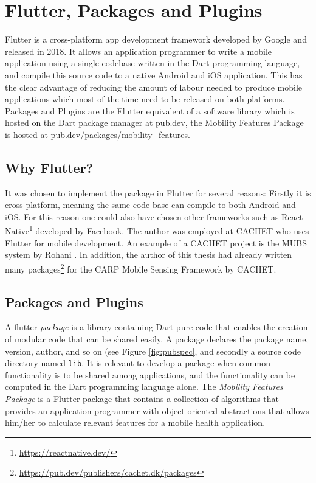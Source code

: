 \section{Flutter, Packages and Plugins}
Flutter is a cross-platform app development framework developed by Google and released in 2018. It allows an application programmer to write a mobile application using a single codebase written in the Dart programming language, and compile this source code to a native Android and iOS application. This has the clear advantage of reducing the amount of labour needed to produce mobile applications which most of the time need to be released on both platforms. Packages and Plugins are the Flutter equivalent of a software library which is hosted on the Dart package manager at \url{pub.dev}, the Mobility Features Package is hosted at \url{pub.dev/packages/mobility_features}. 

\subsection{Why Flutter?}
It was chosen to implement the package in Flutter for several reasons: Firstly it is cross-platform, meaning the same code base can compile to both Android and iOS. For this reason one could also have chosen other frameworks such as React Native\footnote{\url{https://reactnative.dev/}} developed by Facebook. The author was employed at CACHET who uses Flutter for mobile development. An example of a CACHET project is the MUBS system by Rohani \cite{mubs-rohani}. In addition, the author of this thesis had already written many packages\footnote{\url{https://pub.dev/publishers/cachet.dk/packages}} for the CARP Mobile Sensing Framework by CACHET.

\subsection{Packages and Plugins}
A flutter \textit{package} is a library containing Dart pure code that enables the creation of modular code that can be shared easily. A package declares the package name, version, author, and so on (see Figure \ref{fig:pubspec}, and secondly a source code directory named \verb|lib|. It is relevant to develop a package when common functionality is to be shared among applications, and the functionality can be computed in the Dart programming language alone. The \textit{Mobility Features Package} is a Flutter package that contains a collection of algorithms that provides an application programmer with object-oriented abstractions that allows him/her to calculate relevant features for a mobile health application. 

